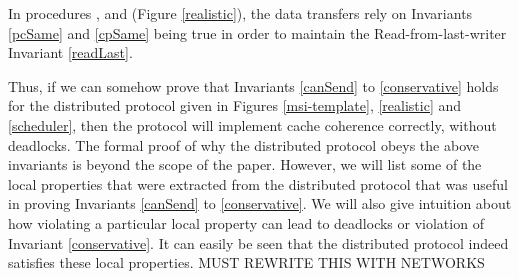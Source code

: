 In procedures \uResp{}, \dResp{} and \dRespL{} (Figure \ref{realistic}), the
data transfers rely on Invariants \ref{pcSame} and \ref{cpSame} being true in
order to maintain the Read-from-last-writer Invariant \ref{readLast}.

Thus, if we can somehow prove that Invariants \ref{canSend} to
\ref{conservative} holds for the distributed protocol given in Figures
\ref{msi-template}, \ref{realistic} and \ref{scheduler}, then the protocol will
implement cache coherence correctly, without deadlocks. The formal proof of why
the distributed protocol obeys the above invariants is beyond the scope of the
paper. However, we will list some of the local properties that were extracted
from the distributed protocol that was useful in proving Invariants
\ref{canSend} to \ref{conservative}. We will also give intuition about how
violating a particular local property can lead to deadlocks or violation of
Invariant \ref{conservative}. It can easily be seen that the distributed
protocol indeed satisfies these local properties. MUST REWRITE THIS WITH NETWORKS
